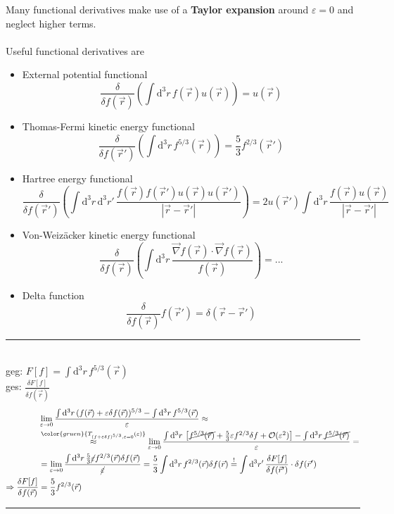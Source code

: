 \documentclass{article}
\newcommand{\diff}{\mathrm{d}}
\newcommand{\lr}[1]{\left(#1\right)}
\newcommand{\lreck}[1]{\left[#1\right]}
\newcommand{\comment}[1]{{\color{gruen} {#1}}}
\begin{document}
Many functional derivatives make use of a \textbf{Taylor expansion} around $\varepsilon=0$ and neglect higher terms.\\\\
Useful functional derivatives are
	\begin{itemize}
		\item External potential functional
			$$\frac{\delta}{\delta f(\vec{r})} \lr{ \int \diff^3r \, f(\vec{r}) u(\vec{r}) } = u(\vec{r})$$


		\item Thomas-Fermi kinetic energy functional
			$$\frac{\delta}{\delta f(\vec{r}')} \lr{ \int \diff^3r \, f^{5/3}(\vec{r}) } = \frac{5}{3}f^{2/3}(\vec{r}')$$


		\item Hartree energy functional
			$$\frac{\delta}{\delta f(\vec{r}')} \lr{ \int \diff^3r \, \diff^3r' \, \frac{ f(\vec{r}) f(\vec{r}') u(\vec{r}) u(\vec{r}') }{ |\vec{r} - \vec{r}'| } } = 2u(\vec{r}') \int \diff^3r \, \frac{f(\vec{r})u(\vec{r})}{|\vec{r} - \vec{r}'|}$$


		\item Von-Weizäcker kinetic energy functional
			$$\frac{\delta}{\delta f(\vec{r})} \lr{ \int \diff^3r \, \frac{\vec{\nabla}f(\vec{r}) \cdot \vec{\nabla}f(\vec{r})}{ f(\vec{r})} } = ... $$
		
		\item Delta function
			\begin{equation}
				\frac{\delta}{\delta f(\vec{r})} f(\vec{r}') = \delta(\vec{r}-\vec{r}')
			\end{equation}
	\end{itemize}


\newpage


{\color{blue}
\hrule
	\\
	geg: $F[f] = \int \diff^3 r\, f^{5/3}(\vec{r})$\\
	ges: $\frac{\delta F[f]}{\delta f(\vec{r})}$
		\begin{align*}
			& \lim_{\varepsilon\to 0} \frac{\int \diff^3 r\, ( f(\vec{r}) + \varepsilon \delta f(\vec{r}) )^{5/3} - \int \diff^3 r \, f^{5/3}(\vec{r})}{\varepsilon} \approx \\
			& \stackrel{ \comment{ T_{(f + \varepsilon \delta f)^{5/3}, \varepsilon = 0}(\varepsilon) } }{\approx} \lim_{\varepsilon\to 0} \frac{\int \diff^3 r\, \lreck{ \cancel{ f^{5/3}(\vec{r}) } + \frac{5}{3} \varepsilon f^{2/3} \delta f + \mathcal{O}(\varepsilon^2) } - \int \diff^3 r\, \cancel{ f^{5/3}(\vec{r})} }{\varepsilon} = \\
			&= \lim_{\varepsilon\to 0} \frac{\int \diff^3 r\, \frac{5}{3} \cancel{\varepsilon} f^{2/3}(\vec{r}) \delta f(\vec{r}) }{ \cancel{\varepsilon} } = \frac{5}{3} \int \diff^3r \, f^{2/3}(\vec{r}) \delta f(\vec{r}) \stackrel{!}{=} \int \diff^3 r' \, \frac{\delta F[f]}{\delta f(\vec{r}')} \cdot \delta f(\vec{r}') \\
			\Rightarrow \frac{\delta F[f]}{\delta f(\vec{r})} &= \frac{5}{3} f^{2/3}(\vec{r})
		\end{align*}
\hrule
}
\end{document}
